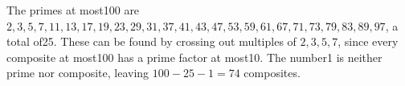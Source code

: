 The primes at most100 are $2,3,5,7,11,13,17,19,23,29,31,37,41,43,47,53,59,61,67,71,73,79,83,89,97$, a total of25. These can be found by crossing out multiples of $2,3,5,7$, since every composite at most100 has a prime factor at most10. The number1 is neither prime nor composite, leaving $100-25-1=\boxed{74}$ composites.
